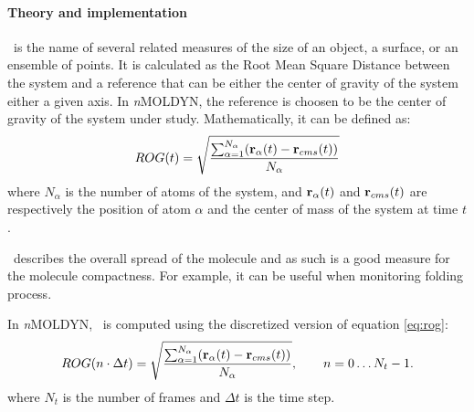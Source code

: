 \documentclass[a4paper,11pt]{report}
\newcommand{\NMOLDYN}{\textit{n}MOLDYN}
\begin{document}
\paragraph{Theory and implementation\\}
\label{rog_theory}
\ROG\ is the name of several related measures of the size of an object, a surface, or an ensemble of 
points. It is calculated as the Root Mean Square Distance between the system and a reference that can be either 
the center of gravity of the system either a given axis. In \NMOLDYN, the reference is choosen to be the center 
of gravity of the system under study. Mathematically, it can be defined as:
\begin{equation}
\label{eq:rog}
ROG(t) = \sqrt{\frac{\sum_{\alpha = 1}^{N_{\alpha}}({\bf r}_{\alpha}(t) - {\bf r}_{cms}(t))}{N_{\alpha}}}
\end{equation}
where $N_{\alpha}$ is the number of atoms of the system, and ${\bf r}_{\alpha}(t)$ and ${\bf r}_{cms}(t)$ are 
respectively the position of atom $\alpha$ and the center of mass of the system at time $t$.

\ROG\ describes the overall spread of the molecule and as such is a good measure for the molecule compactness. For
example, it can be useful when monitoring folding process.

In \NMOLDYN, \ROG\ is computed using the discretized version of equation \ref{eq:rog}:
\begin{equation}
\label{eq:rog_num}
ROG(n\cdot\Delta t) = \sqrt{\frac{\sum_{\alpha = 1}^{N_{\alpha}}({\bf r}_{\alpha}(t) - {\bf r}_{cms}(t))}{N_{\alpha}}},
\qquad n = 0\ldots N_t - 1.
\end{equation}
where $N_t$ is the number of frames and $\Delta t$ is the time step.
\newpage
\end{document}
